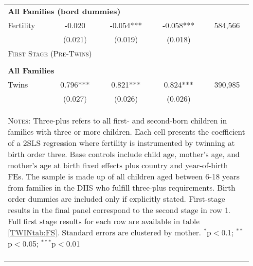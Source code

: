 \begin{table}[!htbp]
\begin{tabular}{lcccc}
\multicolumn{5}{l}{\textbf{All Families (bord dummies)}}\\ 
Fertility&-0.020&-0.054***&-0.058***&584,566\\
         &(0.021)&(0.019)&(0.018)&\\
\midrule\multicolumn{5}{l}{\textsc{First Stage (Pre-Twins)}}\\ 
&&&&\\
\multicolumn{5}{l}{\textbf{All Families}}\\ 
Twins&0.796***&0.821***&0.824***&390,985\\
         &(0.027)&(0.026)&(0.026)&\\
\hline\multicolumn{5}{p{10cm}}{\begin{footnotesize}\textsc{Notes:} Three-plus refers to all first- and second-born children in families with three or more children.  Each cell presents the coefficient of a 2SLS regression where fertility is instrumented by twinning at birth order three.  Base controls include child age, mother's age, and mother's age at birth fixed effects plus country and year-of-birth FEs.  The sample is made up of all children aged between 6-18 years from families in the DHS who fulfill three-plus requirements. Birth order dummies are included only if explicitly stated.  First-stage results in the final panel correspond to the second stage in row 1.  Full first stage results for each row are available in table \ref{TWINtab:FS}. Standard errors are clustered by mother. 
$^{*}$p$<$0.1; $^{**}$p$<$0.05; $^{***}$p$<$0.01\end{footnotesize}}
\\\bottomrule\normalsize\end{tabular}\end{table} 
